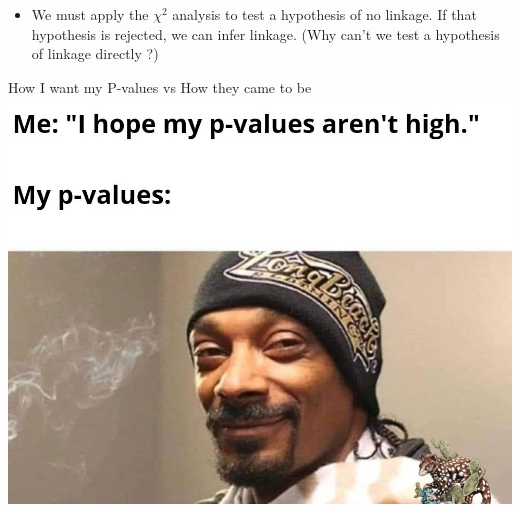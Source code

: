 \documentclass[11pt,ignorenonframetext,aspectratio=169]{beamer}
\providecommand{\tightlist}{%
  \setlength{\itemsep}{0pt}\setlength{\parskip}{0pt}}
\begin{document}
\begin{frame}{}
\protect\hypertarget{section-3}{}
\begin{itemize}
\tightlist
\item
  We must apply the \(\chi^2\) analysis to test a hypothesis of no
  linkage. If that hypothesis is rejected, we can infer linkage. (Why
  can't we test a hypothesis of linkage directly ?)
\end{itemize}

\begin{table}

\caption{\label{tab:chi-sqrt-linkage}Chi-square calculations for the hypothesis that the observations of four phenotypic classes is obtained due to no linkage between loci A and B.}
\centering
{}
\end{table}
\end{frame}

\begin{frame}{How I want my P-values vs How they came to be}
\protect\hypertarget{how-i-want-my-p-values-vs-how-they-came-to-be}{}
\includegraphics[width=0.6\linewidth]{../images/my_p_values}
\end{frame}
\end{document}
